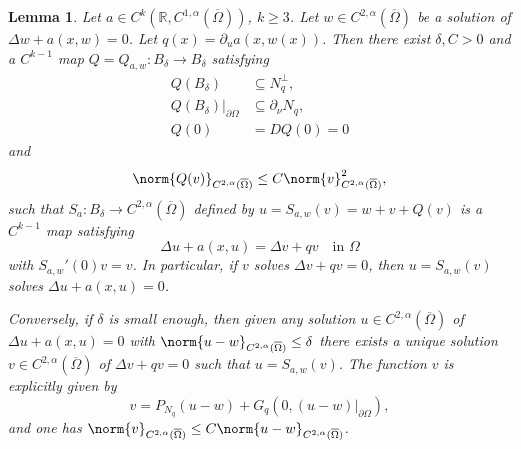 \documentclass[11pt,a4paper]{amsart}
\newtheorem{Lemma}[Theorem]{Lemma}
\theoremstyle{definition}
\numberwithin{equation}{section}
\newcommand{\mR}{\mathbb{R}}                    %
\newcommand{\ol}[1]{\overline{#1}}
\newcommand{\p}{\partial}
\newcommand{\Om}{\Omega}
\begin{document}
\begin{Lemma} \label{lemma_perturbed_sol}
Let $a \in C^{k}(\mR, C^{1,\alpha}(\ol{\Om}))$, $k \geq 3$.
Let $w \in C^{2,\alpha}(\ol{\Omega})$ be a solution of $\Delta w + a(x,w) = 0$.
Let $q(x) = \p_u a(x,w(x))$.
Then there exist $\delta, C > 0$ and a $C^{k-1}$ map $Q = Q_{a,w}: B_{\delta} \to B_{\delta}$ satisfying 
\begin{align*}
Q(B_{\delta}) &\subseteq N_q^{\perp}, \\
Q(B_{\delta})|_{\p \Omega} &\subseteq \p_{\nu} N_q, \\
Q(0) &= DQ(0) = 0
\end{align*}
and
\begin{equation}\label{lemma_estimate_r}
    \norm{Q(v)}_{C^{2,\alpha}(\ol{\Omega})}\leq C\norm{v}_{C^{2,\alpha}(\ol{\Omega})}^2,
\end{equation}
such that \( S_{a}\colon B_{\delta}\to C^{2,\alpha}(\ol{\Omega}) \) defined by \( u = S_{a,w}(v) = w + v + Q(v) \) is a \( C^{k-1} \) map satisfying 
\begin{equation} \label{u_v_eq}
	\Delta u + a(x,u) = \Delta v + q v \quad\text{in }\Omega
\end{equation}
with \( S_{a,w}'(0)v = v \). In particular, if $v$ solves $\Delta v + qv = 0$, then $u = S_{a,w}(v)$ solves $\Delta u + a(x,u) = 0$.

Conversely, if $\delta$ is small enough, then given any solution $u \in C^{2,\alpha}(\ol{\Omega})$ of $\Delta u + a(x,u) = 0$ with $\norm{u-w}_{C^{2,\alpha}(\ol{\Omega})} \leq \delta$ there exists a unique solution $v \in C^{2,\alpha}(\ol{\Omega})$ of $\Delta v + qv = 0$ such that $u = S_{a,w}(v)$. The function $v$ is explicitly given by 
\begin{equation} \label{u_v_converse}
v = P_{N_q}(u-w) + G_q(0, (u-w)|_{\p \Omega}),
\end{equation}
and one has $\norm{v}_{C^{2,\alpha}(\ol{\Omega})} \leq C \norm{u-w}_{C^{2,\alpha}(\ol{\Omega})}$.
\end{Lemma}
\end{document}
